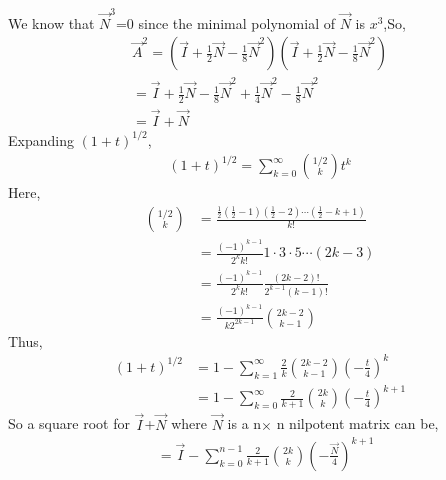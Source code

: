 We know that $\vec{N}^3$=0 since the minimal polynomial of $\vec{N}$ is $x^3$,So,
\begin{align}
\vec{A}^2=\left(\vec{I}+\frac{1}{2}\vec{N}-\frac{1}{8}\vec{N}^2\right)\left(\vec{I}+\frac{1}{2}\vec{N}-\frac{1}{8}\vec{N}^2\right)\\
=\vec{I}+\frac{1}{2}\vec{N}-\frac{1}{8}\vec{N}^2+\frac{1}{4}\vec{N}^2-\frac{1}{8}\vec{N}^2\\
=\vec{I}+\vec{N}
\end{align}
Expanding $(1+t)^{1/2}$,
\begin{align}
(1+t)^{1/2}=\sum_{k=0}^\infty\binom{1/2}{k}t^k
\end{align}
Here,
\begin{align}
\binom{1/2}{k}
&=\frac{\frac12(\frac12-1)(\frac12-2)\cdots(\frac12-k+1)}{k!}\\
&=\frac{(-1)^{k-1}}{2^kk!}1\cdot3\cdot5\cdots(2k-3)\\
&=\frac{(-1)^{k-1}}{2^kk!}\frac{(2k-2)!}{2^{k-1}(k-1)!}\\
&=\frac{(-1)^{k-1}}{k2^{2k-1}}\binom{2k-2}{k-1}
\end{align}
Thus,
\begin{align}
(1+t)^{1/2}
&=1-\sum_{k=1}^\infty\frac2k\binom{2k-2}{k-1}\left(-\frac t4\right)^k\\
&=1-\sum_{k=0}^\infty\frac2{k+1}\binom{2k}{k}\left(-\frac t4\right)^{k+1}
\end{align}
So a square root for $\vec{I}$+$\vec{N}$ where $\vec{N}$ is a n$\times$ n nilpotent matrix can be,
\begin{align}
&=\vec{I}-\sum_{k=0}^{n-1}\frac2{k+1}\binom{2k}{k}\left(-\frac {\vec{N}}{4}\right)^{k+1}
\end{align}

